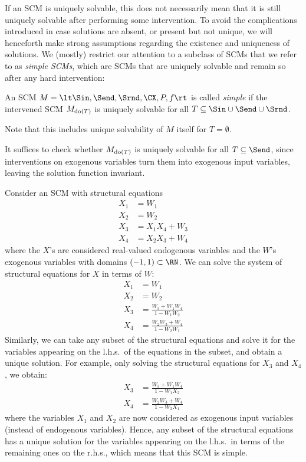 If an SCM is uniquely solvable, this does not necessarily mean that it is still uniquely solvable
after performing some intervention. 
To avoid the complications introduced in case solutions are absent, or present but not unique,
we will henceforth make strong assumptions regarding the existence and uniqueness of solutions. 
We (mostly) restrict our attention to a subclass of SCMs that we refer to as \emph{simple SCMs},
which are SCMs that are uniquely solvable and remain so after any hard intervention:
\begin{Def}\label{def:simple_scm}
  An SCM $M = \lt \Sin, \Send, \Srnd, \CX, P, f \rt$ 
  is called \emph{simple} if the intervened SCM
  $M_{\operatorname{do}(T)}$ is uniquely solvable for all $T \subseteq \Sin \cup \Send \cup \Srnd$.
\end{Def}
Note that this includes unique solvability of $M$ itself for $T = \emptyset$.
\begin{Rem}\label{rem:simple_scm}
  It suffices to check whether $M_{\operatorname{do}(T)}$ is uniquely solvable for all $T \subseteq \Send$,
  since interventions on exogenous variables turn them into exogenous input variables, leaving
  the solution function invariant.
\end{Rem}

\begin{Eg}\label{eg:simple_scm}
Consider an SCM with structural equations
  \begin{align*}
    X_1 &= W_1 \\
    X_2 &= W_2 \\
    X_3 &= X_1 X_4 + W_3 \\
    X_4 &= X_2 X_3 + W_4 
  \end{align*}
where the $X$'s are considered real-valued endogenous variables and the $W$'s exogenous variables with domains $(-1,1) \subset \RN$.
We can solve the system of structural equations for $X$ in terms of $W$:
  \begin{align*}
    X_1 &= W_1 \\
    X_2 &= W_2 \\
    X_3 &= \frac{W_3 + W_1 W_4}{1 - W_1 W_2} \\
    X_4 &= \frac{W_2 W_3 + W_4}{1 - W_2 W_1}
  \end{align*}
Similarly, we can take any subset of the structural equations and solve it for the variables appearing on the l.h.s.\ of the equations in the subset, and obtain a unique solution. For example, only solving the structural equations for $X_3$ and $X_4$, we obtain:
  \begin{align*}
    X_3 &= \frac{W_3 + W_1 W_4}{1 - W_1 X_2} \\
    X_4 &= \frac{W_2 W_3 + W_4}{1 - W_2 X_1}
  \end{align*}
where the variables $X_1$ and $X_2$ are now considered as exogenous input variables (instead of endogenous variables).
Hence, any subset of the structural equations has a unique solution for the variables appearing on the l.h.s.\ in terms
of the remaining ones on the r.h.s., which means that this SCM is simple.
\end{Eg}


